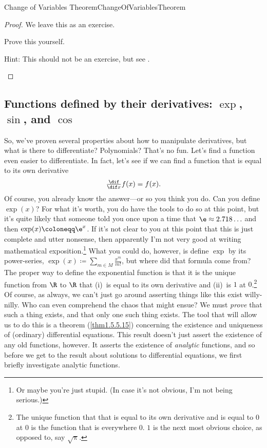 \begin{thm}{Change of Variables Theorem}{ChangeOfVariablesTheorem}
\begin{rmk}
\end{rmk}
\begin{proof}
We leave this as an exercise.
\begin{exr}[breakable=false]{}{}
Prove this yourself.
\begin{rmk}
Hint:  This should not be an exercise, but see \cite[Theorem 6.7.1]{Sally}.
\end{rmk}
\end{exr}
\end{proof}
\end{thm}

\subsection[Functions defined by their derivatives]{Functions defined by their derivatives:  \texorpdfstring{$\exp$}{exp}, \texorpdfstring{$\sin$}{sin}, and \texorpdfstring{$\cos$}{cos}}\label{sbs6.4.4}

So, we've proven several properties about how to manipulate derivatives, but what is there to differentiate?  Polynomials?  That's no fun.  Let's find a function even easier to differentiate.  In fact, let's see if we can find a function that is equal to its own derivative
\begin{equation}
\tfrac{\dif}{\dif x}f(x)=f(x).
\end{equation}
Of course, you already know the answer---or so you think you do.  Can you define $\exp (x)$?  For what it's worth, you do have the tools to do so at this point, but it's quite likely that someone told you once upon a time that $\e \approx 2.718\ldots $ and then $\exp (x)\coloneqq \e ^x$.  If it's not clear to you at this point that this is just complete and utter nonsense, then apparently I'm not very good at writing mathematical exposition.\footnote{Or maybe you're just stupid.  (In case it's not obvious, I'm not being serious\textellipsis .)}  What you could do, however, is define $\exp$ by its power-series, $\exp (x)\coloneqq \sum _{m\in M}\frac{x^m}{m!}$, but where did that formula come from?  The proper way to define the exponential function is that it is the unique function from $\R$ to $\R$ that (i)~is equal to its own derivative and (ii)~is $1$ at $0$.\footnote{The unique function that that is equal to its own derivative and is equal to $0$ at $0$ is the function that is everywhere $0$.  $1$ is the next most obvious choice, as opposed to, say $\sqrt{\uppi}$.}  Of course, as always, we can't just go around asserting things like this exist willy-nilly.  Who can even comprehend the chaos that might ensue?  We must \emph{prove} that such a thing exists, and that only one such thing exists.  The tool that will allow us to do this is a theorem (\cref{thm1.5.5.15}) concerning the existence and uniqueness of (ordinary) differential equations.  This result doesn't just assert the existence of any old functions, however.  It asserts the existence of \emph{analytic} functions, and so before we get to the result about solutions to differential equations, we first briefly investigate analytic functions.

